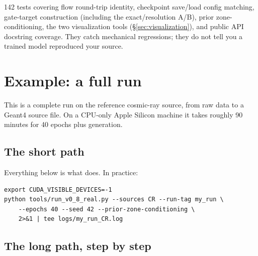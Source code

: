 \documentclass[11pt,a4paper]{article}
\begin{document}
142 tests covering flow round-trip identity, checkpoint save/load config
matching, gate-target construction (including the exact/resolution A/B), prior
zone-conditioning, the two visualization tools (\S\ref{sec:visualization}), and
public API docstring coverage. They catch mechanical regressions; they do not
tell you a trained model reproduced your source.

\section{Example: a full run}
\label{sec:fullrun}

This is a complete run on the reference cosmic-ray source, from raw data to a
Geant4 source file. On a CPU-only Apple Silicon machine it takes roughly 90
minutes for 40 epochs plus generation.

\subsection{The short path}

Everything below is what  does. In practice:

\begin{lstlisting}[language=shell]
export CUDA_VISIBLE_DEVICES=-1
python tools/run_v0_8_real.py --sources CR --run-tag my_run \
    --epochs 40 --seed 42 --prior-zone-conditioning \
    2>&1 | tee logs/my_run_CR.log
\end{lstlisting}

\subsection{The long path, step by step}
\end{document}
